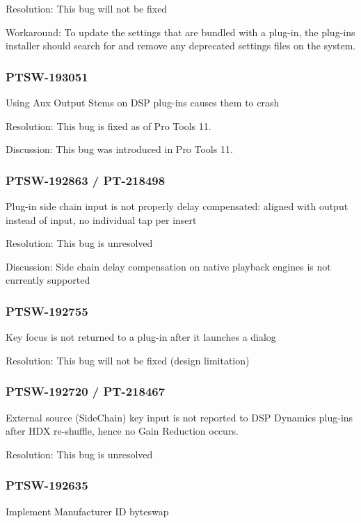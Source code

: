Resolution\+: This bug will not be fixed

Workaround\+: To update the settings that are bundled with a plug-\/in, the plug-\/in\textquotesingle{}s installer should search for and remove any deprecated settings files on the system.\hypertarget{a00374_PTSW-193051}{}\subsubsection{P\+T\+S\+W-\/193051}\label{a00374_PTSW-193051}
Using Aux Output Stems on D\+S\+P plug-\/ins causes them to crash

Resolution\+: This bug is fixed as of Pro Tools 11.

Discussion\+: This bug was introduced in Pro Tools 11.\hypertarget{a00374_PTSW-192863}{}\subsubsection{P\+T\+S\+W-\/192863 / P\+T-\/218498}\label{a00374_PTSW-192863}
Plug-\/in side chain input is not properly delay compensated\+: aligned with output instead of input, no individual tap per insert

Resolution\+: This bug is unresolved

Discussion\+: Side chain delay compensation on native playback engines is not currently supported\hypertarget{a00374_PTSW-192755}{}\subsubsection{P\+T\+S\+W-\/192755}\label{a00374_PTSW-192755}
Key focus is not returned to a plug-\/in after it launches a dialog

Resolution\+: This bug will not be fixed (design limitation)\hypertarget{a00374_PTSW-192720}{}\subsubsection{P\+T\+S\+W-\/192720 / P\+T-\/218467}\label{a00374_PTSW-192720}
External source (Side\+Chain) key input is not reported to D\+S\+P Dynamics plug-\/ins after H\+D\+X re-\/shuffle, hence no Gain Reduction occurs.

Resolution\+: This bug is unresolved\hypertarget{a00374_PTSW-192635}{}\subsubsection{P\+T\+S\+W-\/192635}\label{a00374_PTSW-192635}
Implement Manufacturer I\+D byteswap


